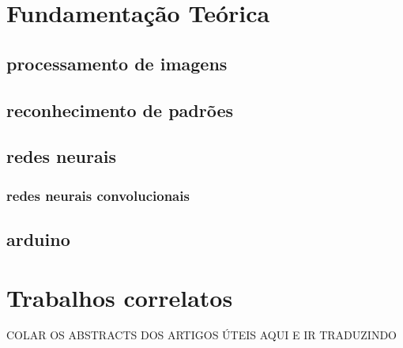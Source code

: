 \section{Fundamentação Teórica}
\subsection{processamento de imagens}
\subsection{reconhecimento de padrões}
\subsection{redes neurais}
\subsubsection{redes neurais convolucionais}
\subsection{arduino}

\section{Trabalhos correlatos}

COLAR OS ABSTRACTS DOS ARTIGOS ÚTEIS AQUI E IR TRADUZINDO